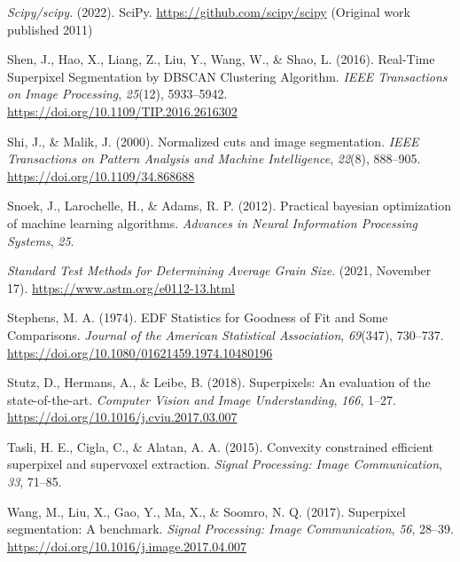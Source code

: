 \documentclass[
  12pt,
  openany]{book}
\newlength{\cslhangindent}
\newlength{\cslentryspacingunit} %
\newenvironment{CSLReferences}[2] %
 {%
  \setlength{\parindent}{0pt}
  \ifodd #1
  \let\oldpar\par
  \def\par{\hangindent=\cslhangindent\oldpar}
  \fi
  \setlength{\parskip}{#2\cslentryspacingunit}
 }%
 {}
\begin{document}
\begin{CSLReferences}{1}{0}
\leavevmode{}%
\emph{Scipy/scipy}. (2022). {SciPy}. \url{https://github.com/scipy/scipy} (Original work published 2011)

\leavevmode{}%
Shen, J., Hao, X., Liang, Z., Liu, Y., Wang, W., \& Shao, L. (2016). Real-{Time Superpixel Segmentation} by {DBSCAN Clustering Algorithm}. \emph{IEEE Transactions on Image Processing}, \emph{25}(12), 5933--5942. \url{https://doi.org/10.1109/TIP.2016.2616302}

\leavevmode{}%
Shi, J., \& Malik, J. (2000). Normalized cuts and image segmentation. \emph{IEEE Transactions on Pattern Analysis and Machine Intelligence}, \emph{22}(8), 888--905. \url{https://doi.org/10.1109/34.868688}

\leavevmode{}%
Snoek, J., Larochelle, H., \& Adams, R. P. (2012). Practical bayesian optimization of machine learning algorithms. \emph{Advances in Neural Information Processing Systems}, \emph{25}.

\leavevmode{}%
\emph{Standard {Test Methods} for {Determining Average Grain Size}}. (2021, November 17). \url{https://www.astm.org/e0112-13.html}

\leavevmode{}%
Stephens, M. A. (1974). {EDF Statistics} for {Goodness} of {Fit} and {Some Comparisons}. \emph{Journal of the American Statistical Association}, \emph{69}(347), 730--737. \url{https://doi.org/10.1080/01621459.1974.10480196}

\leavevmode{}%
Stutz, D., Hermans, A., \& Leibe, B. (2018). Superpixels: {An} evaluation of the state-of-the-art. \emph{Computer Vision and Image Understanding}, \emph{166}, 1--27. \url{https://doi.org/10.1016/j.cviu.2017.03.007}

\leavevmode{}%
Tasli, H. E., Cigla, C., \& Alatan, A. A. (2015). Convexity constrained efficient superpixel and supervoxel extraction. \emph{Signal Processing: Image Communication}, \emph{33}, 71--85.

\leavevmode{}%
Wang, M., Liu, X., Gao, Y., Ma, X., \& Soomro, N. Q. (2017). Superpixel segmentation: {A} benchmark. \emph{Signal Processing: Image Communication}, \emph{56}, 28--39. \url{https://doi.org/10.1016/j.image.2017.04.007}


\end{CSLReferences}
\end{document}

